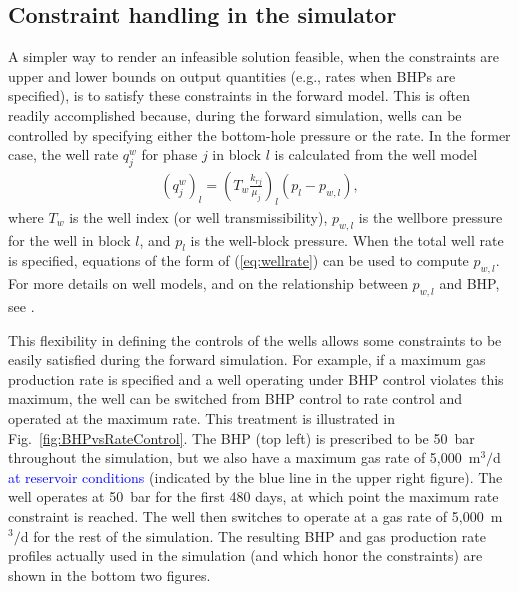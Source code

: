 \documentclass[twocolumn,numbook]{svjour3}          %
\newcommand{\blue}[1]{\textcolor{blue}{#1}}
\begin{document}
\subsection{Constraint handling in the simulator}  \label{sec:constr-sim}

A simpler way to render an infeasible solution feasible, when the
constraints are upper and lower bounds on output quantities 
(e.g., rates when BHPs are specified), is to satisfy these constraints 
in the forward model. This is often readily accomplished because, during the forward
simulation, wells can be controlled by specifying either the bottom-hole 
pressure or the rate. In the former case,
the well rate $q_j^w$ for phase $j$ in block $l$ is calculated from the well model
%
\begin{align}
\label{eq:wellrate}
  \left( q_j^w \right)_l = \left( T_w\frac{k_{rj}}{\mu_j} \right)_l (p_l - p_{w,l}),
\end{align}
%
where $T_w$ is the well index (or well transmissibility), $p_{w,l}$ is the 
wellbore pressure for the well in block $l$, and $p_l$ is the well-block pressure.
When the total well rate is specified, equations of the form of (\ref{eq:wellrate}) 
can be used to compute $p_{w,l}$. For more details on well models, and on the 
relationship between $p_{w,l}$ and BHP, see \cite{Cao:Thesis}.
%

This flexibility in defining the controls of the wells allows some constraints
to be easily satisfied during the forward simulation. For example, if a maximum
gas production rate is specified and a well operating under BHP control violates
this maximum, the well can be switched from BHP control to rate control and
operated at the maximum rate. This treatment is illustrated in
Fig.~\ref{fig:BHPvsRateControl}. The BHP (top left) is prescribed to be 50~bar
throughout the simulation, but we also have a maximum gas rate of 5,000~m$^3/$d \blue{at reservoir conditions}
(indicated by the blue line in the upper right figure). The well operates at
50~bar for the first 480 days, at which point the maximum rate constraint is
reached. The well then switches to operate at a gas rate of 5,000~m$^3/$d for the
rest of the simulation. The resulting BHP and gas production rate profiles
actually used in the simulation (and which honor the constraints) are shown in
the bottom two figures.
\end{document}
